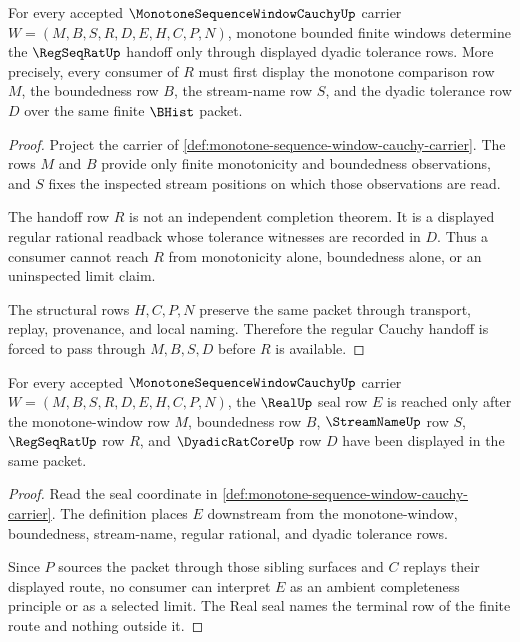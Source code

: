 \begin{theorem}
\label{thm:monotone-sequence-window-regular-cauchy-handoff}
For every accepted $\MonotoneSequenceWindowCauchyUp$ carrier $W=(M,B,S,R,D,E,H,C,P,N)$, monotone bounded finite windows determine the $\RegSeqRatUp$ handoff only through displayed dyadic tolerance rows. More precisely, every consumer of $R$ must first display the monotone comparison row $M$, the boundedness row $B$, the stream-name row $S$, and the dyadic tolerance row $D$ over the same finite $\BHist$ packet.
\end{theorem}
\begin{proof}
Project the carrier of \autoref{def:monotone-sequence-window-cauchy-carrier}. The rows $M$ and $B$ provide only finite monotonicity and boundedness observations, and $S$ fixes the inspected stream positions on which those observations are read.

The handoff row $R$ is not an independent completion theorem. It is a displayed regular rational readback whose tolerance witnesses are recorded in $D$. Thus a consumer cannot reach $R$ from monotonicity alone, boundedness alone, or an uninspected limit claim.

The structural rows $H,C,P,N$ preserve the same packet through transport, replay, provenance, and local naming. Therefore the regular Cauchy handoff is forced to pass through $M,B,S,D$ before $R$ is available.
\end{proof}

\begin{theorem}
\label{thm:monotone-sequence-window-real-seal-nonescape}
For every accepted $\MonotoneSequenceWindowCauchyUp$ carrier $W=(M,B,S,R,D,E,H,C,P,N)$, the $\RealUp$ seal row $E$ is reached only after the monotone-window row $M$, boundedness row $B$, $\StreamNameUp$ row $S$, $\RegSeqRatUp$ row $R$, and $\DyadicRatCoreUp$ row $D$ have been displayed in the same packet.
\end{theorem}
\begin{proof}
Read the seal coordinate in \autoref{def:monotone-sequence-window-cauchy-carrier}. The definition places $E$ downstream from the monotone-window, boundedness, stream-name, regular rational, and dyadic tolerance rows.

Since $P$ sources the packet through those sibling surfaces and $C$ replays their displayed route, no consumer can interpret $E$ as an ambient completeness principle or as a selected limit. The Real seal names the terminal row of the finite route and nothing outside it.
\end{proof}

